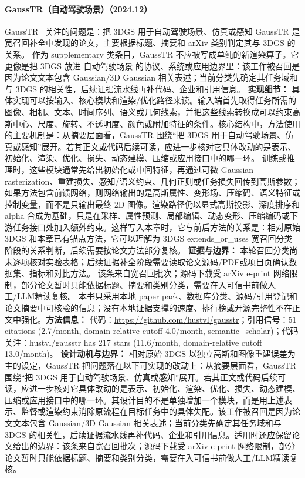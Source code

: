 \paragraph{GaussTR（自动驾驶场景）（2024.12）}
GaussTR~\cite{2412_13193} 关注的问题是：把 3DGS 用于自动驾驶场景、仿真或感知 GaussTR 是宽召回补全中发现的论文，主要根据标题、摘要和 arXiv 类别判定其与 3DGS 的关系。
作为 supplementary 类条目，GaussTR 不应被写成单纯的新渲染算子。它更像是把 3DGS 放进 自动驾驶场景 的协议、系统或应用边界里：该工作被召回是因为论文文本包含 Gaussian/3D Gaussian 相关表述；当前分类先确定其任务域和与 3DGS 的相关性，后续证据流水线再补代码、企业和引用信息。
\textbf{实现细节：} 具体实现可以按输入、核心模块和渲染/优化路径来读。输入端首先取得任务所需的图像、相机、文本、时间序列、语义或几何线索，并把这些线索转换成可以约束高斯中心、尺度、旋转、不透明度、颜色或附加特征的条件。核心结构中，方法使用的主要机制是：从摘要层面看，GaussTR 围绕“把 3DGS 用于自动驾驶场景、仿真或感知”展开。若其正文或代码后续可读，应进一步核对它具体改动的是表示、初始化、渲染、优化、损失、动态建模、压缩或应用接口中的哪一环。 训练或推理时，这些模块通常先给出初始化或中间特征，再通过可微 Gaussian rasterization、重建损失、感知/语义约束、几何正则或任务损失回传到高斯参数；如果方法包含前馈网络，则网络输出的是高斯属性、变形场、压缩码、语义特征或控制变量，而不是只输出最终 2D 图像。渲染路径仍以显式高斯投影、深度排序和 alpha 合成为基础，只是在采样、属性预测、局部编辑、动态变形、压缩编码或下游任务接口处加入额外约束。这样写入本章时，它与前后方法的关系是：相对原始 3DGS 和本章已有锚点方法，它可以理解为 3DGS extends\_or\_uses 宽召回分类阶段的关系判断，后续需要按论文方法部分复核。
\textbf{证据与边界：} 本轮召回分类尚未逐项核对实验表格；后续证据补全阶段需要读取论文源码/PDF或项目页确认数据集、指标和对比方法。 该条来自宽召回批次；源码下载受 arXiv e-print 网络限制，部分论文暂时只能依据标题、摘要和类别分类，需要在入可信书前做人工/LLM精读复核。 本书只采用本地 paper pack、数据库分类、源码/引用登记和论文摘要中可核验的信息；没有本地证据支撑的速度、排行榜或开源完整性不在正文中强化。\textbf{方法信息：} 代码：\url{https://github.com/hustvl/gausstr}；引用信号：51 citations (2.7/month, domain-relative cutoff 4.0/month, semantic\_scholar)；代码关注：hustvl/gausstr has 217 stars (11.6/month, domain-relative cutoff 13.0/month)。
\textbf{设计动机与边界：} 相对原始 3DGS 以独立高斯和图像重建误差为主的设定，GaussTR 把问题落在以下可实现的改动上：从摘要层面看，GaussTR 围绕“把 3DGS 用于自动驾驶场景、仿真或感知”展开。若其正文或代码后续可读，应进一步核对它具体改动的是表示、初始化、渲染、优化、损失、动态建模、压缩或应用接口中的哪一环。其设计目的不是单独增加一个模块，而是用上述表示、监督或渲染约束消除原流程在目标任务中的具体失配。该工作被召回是因为论文文本包含 Gaussian/3D Gaussian 相关表述；当前分类先确定其任务域和与 3DGS 的相关性，后续证据流水线再补代码、企业和引用信息。适用时还应保留论文给出的边界：该条来自宽召回批次；源码下载受 arXiv e-print 网络限制，部分论文暂时只能依据标题、摘要和类别分类，需要在入可信书前做人工/LLM精读复核。
